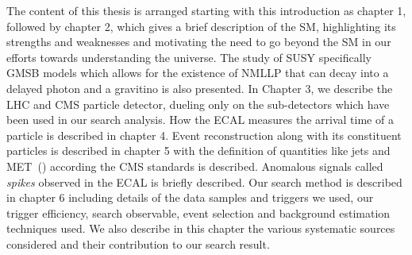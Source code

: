 \par %
The content of this thesis is arranged starting with this introduction as chapter 1, followed by chapter 2, which gives a 
brief description of the SM, highlighting its strengths and weaknesses and motivating the need to go beyond the SM in our efforts towards understanding the universe. The study of SUSY specifically  GMSB models which allows for the existence of NMLLP that can decay into a delayed photon and a gravitino is also presented.
In Chapter 3,  we describe the  LHC and CMS particle detector, dueling only on the sub-detectors which have been used in our search analysis. How the ECAL measures the arrival time of a particle is described in chapter 4.
Event reconstruction along with its constituent particles is described in chapter 5 with the definition of quantities like jets and MET~(\MET) according the CMS standards is described. Anomalous signals called \textit{spikes} observed in the  ECAL is briefly described.
Our search method is described in chapter 6 including details of the data samples and triggers we used, our trigger efficiency, search observable, event selection and background estimation techniques used. We also describe  in this chapter the various systematic sources considered and their contribution to our search result.
